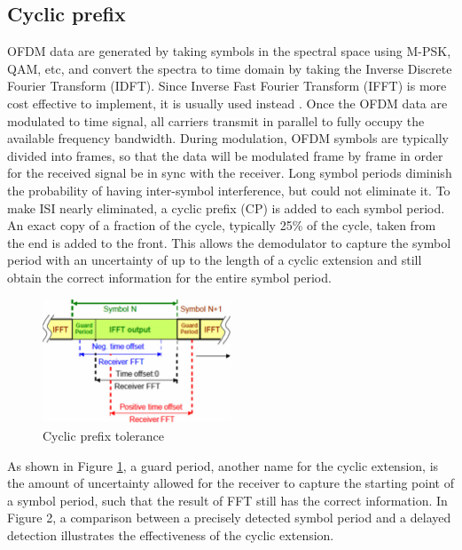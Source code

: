 \subsection{Cyclic prefix}
OFDM data are generated by taking symbols in the spectral space using M-PSK, QAM, etc, and convert the spectra to time domain by taking the Inverse Discrete Fourier Transform (IDFT). Since Inverse Fast Fourier Transform (IFFT) is more cost effective to implement, it is usually used instead \cite{b3}. Once the OFDM data are modulated to time signal, all carriers transmit in parallel to fully occupy the available frequency bandwidth. During modulation, OFDM symbols are typically divided into frames, so that the data will be modulated frame by frame in order for the received signal be in sync with the receiver. Long symbol periods diminish the probability of having inter-symbol interference, but could not eliminate it. To make ISI nearly eliminated, a cyclic prefix (CP) is added to each symbol period. An exact copy of a fraction of the cycle, typically 25\% of the cycle, taken from the end is added to the front. This allows the demodulator to capture the symbol period with an uncertainty of up to the length of a cyclic extension and still obtain the correct information for the entire symbol period.

\begin{figure}[ht]
    \centering
    \includegraphics[width=0.5\textwidth]{Figures/Cyclic-extension-tolerance}
    \caption{Cyclic prefix tolerance}
    \label{Cyclic-extension-tolerance}
\end{figure}

As shown in Figure \ref{Cyclic-extension-tolerance}, a guard period, another name for the cyclic extension, is the amount of uncertainty allowed for the receiver to capture the starting point of a symbol period, such that the result of FFT still has the correct information. In Figure 2, a comparison between a precisely detected symbol period and a delayed detection illustrates the effectiveness of the cyclic extension.

